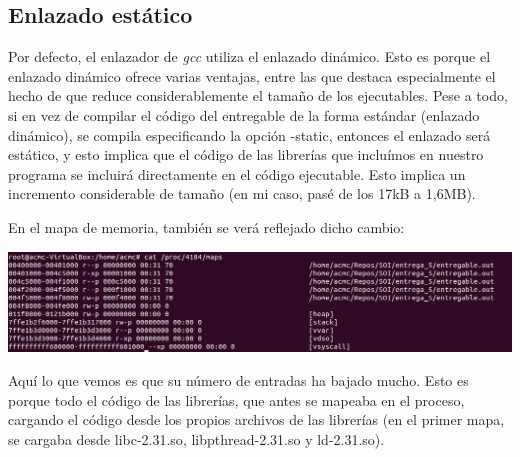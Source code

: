 \documentclass[a4paper]{article}
\begin{document}
\subsection{Enlazado estático}

Por defecto, el enlazador de \emph{gcc} utiliza el enlazado dinámico. Esto es porque el enlazado dinámico ofrece varias ventajas, entre las que destaca especialmente el hecho de que reduce considerablemente el tamaño de los ejecutables. Pese a todo, si en vez de compilar el código del entregable de la forma estándar (enlazado dinámico), se compila especificando la opción {\ttfamily -static}, entonces el enlazado será estático, y esto implica que el código de las librerías que incluímos en nuestro programa se incluirá directamente en el código ejecutable. Esto implica un incremento considerable de tamaño (en mi caso, pasé de los 17kB a 1,6MB).

En el mapa de memoria, también se verá reflejado dicho cambio:

\includegraphics[scale=0.408]{Captura_estatico.png}

Aquí lo que vemos es que su número de entradas ha bajado mucho. Esto es porque todo el código de las librerías, que antes se mapeaba en el proceso, cargando el código desde los propios archivos de las librerías (en el primer mapa, se cargaba desde {\ttfamily libc-2.31.so}, {\ttfamily libpthread-2.31.so} y {\ttfamily ld-2.31.so}).
\end{document}
